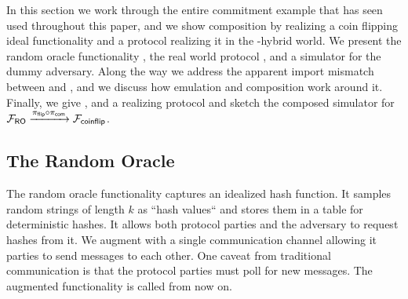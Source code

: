 In this section we work through the entire commitment example that has seen used throughout this paper, and we show composition by realizing a coin flipping ideal functionality \Fflip and a protocol realizing it in the \Fcom-hybrid world.
We present the random oracle functionality \Fro, the real world protocol , and a simulator for the dummy adversary.
Along the way we address the apparent import mismatch between \Fcom and \Fro, and we discuss how emulation and composition work around it.
Finally, we give \Fflip, and a realizing protocol and sketch the composed simulator for $\mathcal{F}_{{\mathsf {RO}}} \xrightarrow{\pi_{{\mathsf {flip}}} \circ \pi_{{\mathsf {com}}}} \mathcal{F}_{{\mathsf {coinflip}}}$.

%

\subsection{The Random Oracle}
The random oracle functionality captures an idealized hash function. It samples random strings of length $k$ as ``hash values`` and stores them in a table for deterministic hashes.
It allows both protocol parties and the adversary to request hashes from it.
We augment \Fro with a single communication channel allowing it parties to send messages to each other. One caveat from traditional communication
is that the protocol parties must poll \Fro for new messages. The augmented functionality is called \Fropp from now on.

